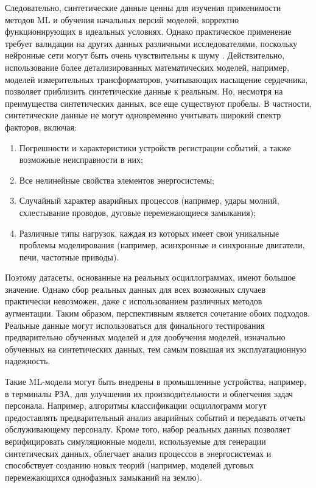 Следовательно, синтетические данные ценны для изучения применимости методов ML
\cite{bavr_bib_085_r_2021} и обучения начальных версий моделей, корректно
функционирующих в идеальных условиях. Однако практическое применение требует валидации
на других данных различными исследователями, поскольку нейронные сети могут быть очень
чувствительны к шуму \cite{bavr_bib_086_r_2023,bavr_bib_087_v_2024}. Действительно,
использование более детализированных математических моделей, например, моделей
измерительных трансформаторов, учитывающих насыщение сердечника, позволяет приблизить
синтетические данные к реальным. Но, несмотря на преимущества синтетических данных, все
еще существуют пробелы. В частности, синтетические данные не могут одновременно
учитывать широкий спектр факторов, включая:\par\vspace{0.2cm}

\begin{enumerate}[label=\arabic*),itemsep=0pt,topsep=2pt]
  \item Погрешности и характеристики устройств регистрации событий, а также возможные неисправности в них;
  \item Все нелинейные свойства элементов энергосистемы;
  \item Случайный характер аварийных процессов (например, удары молний, схлестывание проводов, дуговые перемежающиеся замыкания);
  \item Различные типы нагрузок, каждая из которых имеет свои уникальные проблемы моделирования (например, асинхронные и синхронные двигатели, печи, частотные приводы).
\end{enumerate}\par\vspace{0.2cm}

Поэтому датасеты, основанные на реальных осциллограммах, имеют большое значение. Однако
сбор реальных данных для всех возможных случаев практически невозможен, даже с
использованием различных методов аугментации. Таким образом, перспективным является
сочетание обоих подходов. Реальные данные могут использоваться для финального
тестирования предварительно обученных моделей и для дообучения моделей, изначально
обученных на синтетических данных, тем самым повышая их эксплуатационную
надежность.\par\vspace{0.2cm}

Такие ML-модели могут быть внедрены в промышленные устройства, например, в терминалы
РЗА, для улучшения их производительности и облегчения задач персонала. Например,
алгоритмы классификации осциллограмм могут предоставлять предварительный анализ
аварийных событий и передавать отчеты обслуживающему персоналу. Кроме того, набор
реальных данных позволяет верифицировать симуляционные модели, используемые для
генерации синтетических данных, облегчает анализ процессов в энергосистемах и
способствует созданию новых теорий (например, моделей дуговых перемежающихся однофазных
замыканий на землю).\par\vspace{0.2cm}

